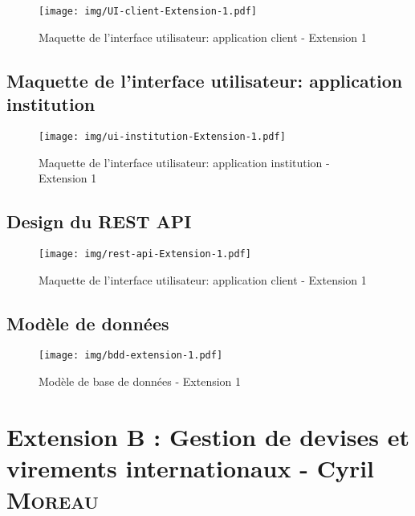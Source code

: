 \documentclass[]{report}
\begin{document}
\begin{figure}[h!]
	\centering\texttt{[image: img/UI-client-Extension-1.pdf]}
	\caption{Maquette de l'interface utilisateur: application client - Extension 1}
\end{figure}



\newpage
\section{Maquette de l'interface utilisateur: application institution}

\begin{figure}[h!]
	\centering\texttt{[image: img/ui-institution-Extension-1.pdf]}
	\caption{Maquette de l'interface utilisateur: application institution - Extension 1}
\end{figure}


\newpage
\section{Design du REST API}

\begin{figure}[h!]
	\centering\texttt{[image: img/rest-api-Extension-1.pdf]}
	\caption{Maquette de l'interface utilisateur: application client - Extension 1}
\end{figure}



\newpage

\section{Modèle de données}

\begin{figure}[h!]
	\centering\texttt{[image: img/bdd-extension-1.pdf]}
	\caption{Modèle de base de données - Extension 1}
\end{figure}



\newpage




\chapter{Extension B : Gestion de devises et virements internationaux - Cyril \textsc{Moreau}}
\end{document}
